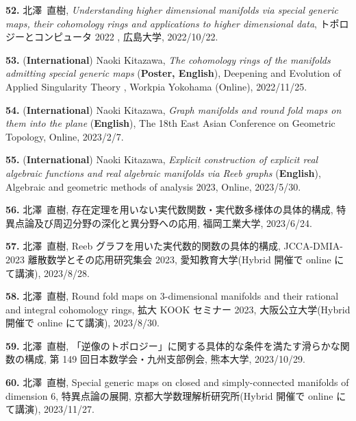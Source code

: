 \documentclass{article}
\begin{document}
\par\noindent
{\bf 52.} 北澤\ 直樹, \textsl{Understanding higher dimensional manifolds via special generic maps, their cohomology rings and applications to higher dimensional data}, トポロジーとコンピュータ 2022 , 広島大学, 2022/10/22.

\par\noindent
{\bf 53.} ({\bf International}) Naoki Kitazawa, \textsl{The cohomology rings of the manifolds admitting special generic maps} ({\bf Poster, English}), Deepening and Evolution of Applied Singularity Theory , Workpia Yokohama (Online), 2022/11/25.

\par\noindent
{\bf 54.} ({\bf International}) Naoki Kitazawa,  \textsl{Graph manifolds and round fold maps on them into the plane} ({\bf English}), The 18th East Asian Conference on Geometric Topology, Online, 2023/2/7.

\par\noindent
{\bf 55.} ({\bf International}) Naoki Kitazawa,  \textsl{Explicit construction of explicit real algebraic functions and real algebraic manifolds via Reeb graphs} ({\bf English}), Algebraic and geometric methods of analysis 2023, Online, 2023/5/30.

\par\noindent
{\bf 56.} 北澤\ 直樹,  存在定理を用いない実代数関数・実代数多様体の具体的構成, 特異点論及び周辺分野の深化と異分野への応用, 福岡工業大学, 2023/6/24.

\par\noindent
{\bf 57.} 北澤\ 直樹, Reeb グラフを用いた実代数的関数の具体的構成, JCCA-DMIA-2023 離散数学とその応用研究集会 2023, 愛知教育大学(Hybrid 開催で online にて講演), 2023/8/28.

\par\noindent
{\bf 58.} 北澤\ 直樹,  Round fold maps on $3$-dimensional manifolds and their rational and
 integral cohomology rings, 拡大 KOOK セミナー 2023, 大阪公立大学(Hybrid 開催で online にて講演), 2023/8/30.

\par\noindent
{\bf 59.} 北澤\ 直樹,  「逆像のトポロジー」に関する具体的な条件を満たす滑らかな関数の構成, 第 149 回日本数学会・九州支部例会, 熊本大学, 2023/10/29.

\par\noindent
{\bf 60.} 北澤\ 直樹,  Special generic maps on closed and simply-connected manifolds of dimension $6$, 特異点論の展開, 京都大学数理解析研究所(Hybrid 開催で online にて講演), 2023/11/27.
\end{document}
